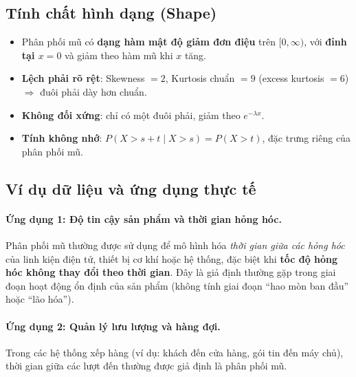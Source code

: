 \documentclass[a4paper,12pt]{article}
\begin{document}
\subsection{Tính chất hình dạng (Shape)}

\begin{itemize}
    \item Phân phối mũ có \textbf{dạng hàm mật độ giảm đơn điệu} trên $[0,\infty)$, với \textbf{đỉnh tại $x=0$} và giảm theo hàm mũ khi $x$ tăng.
    \item \textbf{Lệch phải rõ rệt}: Skewness $= 2$, Kurtosis chuẩn $= 9$ (excess kurtosis $= 6$) $\Rightarrow$ đuôi phải dày hơn chuẩn.
    \item \textbf{Không đối xứng}: chỉ có một đuôi phải, giảm theo $e^{-\lambda x}$.
    \item \textbf{Tính không nhớ}: $P(X > s + t \mid X > s) = P(X > t)$, đặc trưng riêng của phân phối mũ.
\end{itemize}

\subsection{Ví dụ dữ liệu và ứng dụng thực tế}

\paragraph{Ứng dụng 1: Độ tin cậy sản phẩm và thời gian hỏng hóc.}  
Phân phối mũ thường được sử dụng để mô hình hóa \textit{thời gian giữa các hỏng hóc} của linh kiện điện tử, thiết bị cơ khí hoặc hệ thống, đặc biệt khi \textbf{tốc độ hỏng hóc không thay đổi theo thời gian}. Đây là giả định thường gặp trong giai đoạn hoạt động ổn định của sản phẩm (không tính giai đoạn “hao mòn ban đầu” hoặc “lão hóa”).

\paragraph{Ứng dụng 2: Quản lý lưu lượng và hàng đợi.}  
Trong các hệ thống xếp hàng (ví dụ: khách đến cửa hàng, gói tin đến máy chủ), thời gian giữa các lượt đến thường được giả định là phân phối mũ.
\end{document}
